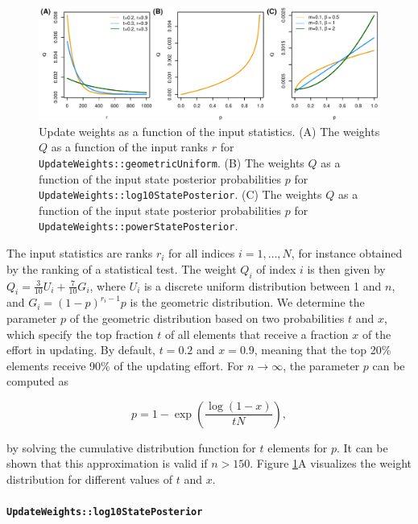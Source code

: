 \documentclass[a4paper,11pt]{article}
\newcommand{\enum}[1]{\texttt{#1}}
\begin{document}
\begin{figure}[t]
\begin{center}
\includegraphics[width=\textwidth]{Figures/updateWeights.pdf}
\end{center}
\caption{Update weights as a function of the input statistics. (A) The weights $Q$ as a function of the input ranks $r$ for \enum{UpdateWeights::geometricUniform}. (B) The weights $Q$ as a function of the input state posterior probabilities $p$ for \enum{UpdateWeights::log10StatePosterior}. (C) The weights $Q$ as a function of the input state posterior probabilities $p$ for \enum{UpdateWeights::powerStatePosterior}. }
\label{fig:updateWeights}
\end{figure}

The input statistics are ranks $r_i$ for all indices $i = 1, \ldots, N$, for instance obtained by the ranking of a statistical test. The weight $Q_i$ of index $i$ is then given by $Q_i = \frac{3}{10}U_i + \frac{7}{10} G_i$, where $U_i$ is a discrete uniform distribution between 1 and $n$, and $G_i = (1-p)^{r_i-1}p$ is the geometric distribution. We determine the parameter $p$ of the geometric distribution based on two probabilities $t$ and $x$, which specify the top fraction $t$ of all elements that receive a fraction $x$ of the effort in updating. By default, $t = 0.2$ and $x = 0.9$, meaning that the top 20\% elements receive 90\% of the updating effort. For $n \to \infty$, the parameter $p$ can be computed as

\begin{equation*}
 p = 1-\exp\left(\frac{\log(1-x)}{tN}\right),
\end{equation*}

by solving the cumulative distribution function for $t$ elements for $p$. It can be shown that this approximation is valid if $n > 150$. Figure \ref{fig:updateWeights}A visualizes the weight distribution for different values of $t$ and $x$.

\paragraph{\enum{UpdateWeights::log10StatePosterior}}
\end{document}
